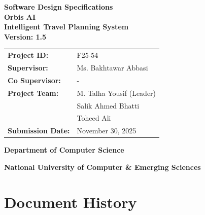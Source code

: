\documentclass[11pt, a4paper]{article}
\newcommand{\projectname}{Orbis AI}
\newcommand{\projectversion}{1.5}
\newcommand{\supervisor}{Ms. Bakhtawar Abbasi}
\begin{document}
\begin{titlepage}
    \centering
    \vspace*{2cm}
    
    {\Huge \textbf{Software Design Specifications}}\\[1cm]
    {\huge \textbf{\projectname}}\\[0.5cm]
    {\Large \textbf{Intelligent Travel Planning System}}\\[0.5cm]
    {\Large \textbf{Version: \projectversion}}\\[2cm]
    
    \begin{tabularx}{0.8\textwidth}{l X}
        \textbf{Project ID:} & F25-54 \\ [10pt]
        \textbf{Supervisor:} & \supervisor \\ [10pt]
        \textbf{Co Supervisor:} & - \\ [10pt]
        \textbf{Project Team:} & M. Talha Yousif (Leader) \\
         & Salik Ahmed Bhatti \\
         & Toheed Ali \\ [10pt]
        \textbf{Submission Date:} & November 30, 2025 \\
    \end{tabularx}
    
    \vfill
    
    {\large \textbf{Department of Computer Science}}
    
    \vspace*{1cm}
    {\large \textbf{National University of Computer \& Emerging Sciences}}
\end{titlepage}


\newpage
\section*{Document History}

\vspace{0.5cm}
\end{document}
